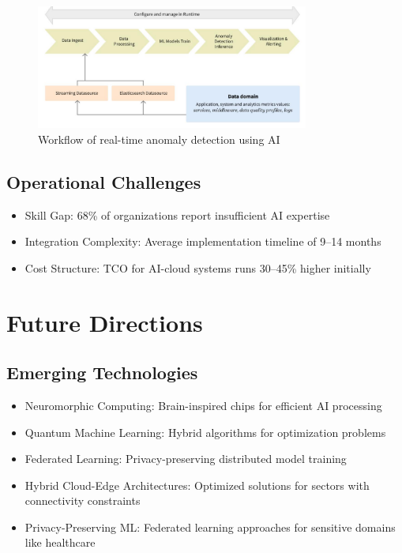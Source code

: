 \documentclass[a4paper,12pt]{article}
\begin{document}
\begin{figure}[H]
    \centering
    \includegraphics[width=0.8\textwidth]{image3.png}
    \caption{Workflow of real-time anomaly detection using AI}
    \label{fig:workflow-anomaly-detection-ai}
\end{figure}

\subsection{Operational Challenges}
\begin{itemize}
    \item Skill Gap: 68\% of organizations report insufficient AI expertise
    \item Integration Complexity: Average implementation timeline of 9--14 months
    \item Cost Structure: TCO for AI-cloud systems runs 30--45\% higher initially
\end{itemize}

\section{Future Directions}
\subsection{Emerging Technologies}
\begin{itemize}
    \item Neuromorphic Computing: Brain-inspired chips for efficient AI processing
    \item Quantum Machine Learning: Hybrid algorithms for optimization problems
    \item Federated Learning: Privacy-preserving distributed model training
    \item Hybrid Cloud-Edge Architectures: Optimized solutions for sectors with connectivity constraints
    \item Privacy-Preserving ML: Federated learning approaches for sensitive domains like healthcare
\end{itemize}
\end{document}
